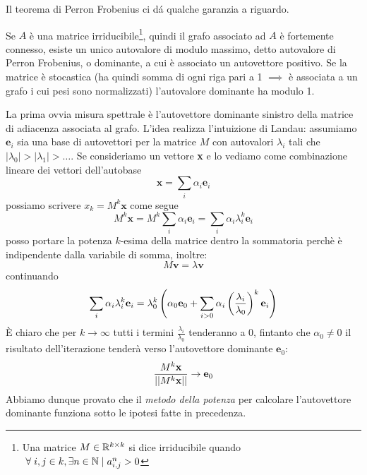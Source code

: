 Il teorema di Perron Frobenius ci dá qualche garanzia a riguardo.
\begin{teo}
    Se $A$ è una matrice irriducibile\footnote{Una matrice $M \in \mathbb{R}^{k \times k}$ si dice irriducibile quando $\hspace{1mm}\forall \hspace{1mm} i, j \in k, \exists n \in \mathbb{N} \hspace{1mm}|\hspace{1mm} a_{i, j}^n > 0$}, quindi il grafo associato ad $A$ è fortemente connesso, esiste un unico autovalore di modulo massimo, detto autovalore di Perron Frobenius, o dominante, a cui è associato un autovettore positivo. Se la matrice è stocastica (ha quindi somma di ogni riga pari a 1 $\implies$ è associata a un grafo i cui pesi sono normalizzati) l'autovalore dominante ha modulo 1.
\end{teo}
\noindent La prima ovvia misura spettrale è l'autovettore dominante sinistro della matrice di adiacenza associata al grafo. L'idea realizza l'intuizione di Landau: assumiamo $\textbf{e}_i$ sia una base di autovettori per la matrice $M$ con autovalori $\lambda_i$ tali che $|\lambda_0| > |\lambda_1| > \dots$. Se consideriamo un vettore \textbf{x} e lo vediamo come combinazione lineare dei vettori dell'autobase
\begin{equation*}
    \textbf{x} = \sum_i{\alpha_i\textbf{e}_i}
\end{equation*}
possiamo scrivere $x_k = M^k\textbf{x}$ come segue
\begin{equation*}
    M^k\textbf{x} = M^k\sum_i{\alpha_i\textbf{e}_i} = \sum_i{\alpha_i \lambda_i^k \textbf{e}_i}
\end{equation*}
posso portare la potenza $k$-esima della matrice dentro la sommatoria perchè è indipendente dalla variabile di somma, inoltre:
\begin{equation*}
    M\textbf{v} = \lambda \textbf{v}
\end{equation*}
continuando
\begin{equation*}
    \sum_i{\alpha_i \lambda_i^k \textbf{e}_i} = \lambda_0^k\left(\alpha_0\textbf{e}_0 + \sum_{i > 0}{\alpha_i\left(\frac{\lambda_i}{\lambda_0}\right)^k\textbf{e}_i}\right)
\end{equation*}
È chiaro che per $k \to \infty$ tutti i termini $\frac{\lambda_i}{\lambda_0}$ tenderanno a 0, fintanto che $\alpha_0 \neq 0$ il risultato dell'iterazione tenderà verso l'autovettore dominante $\textbf{e}_0$:
\begin{equation*}
    \frac{M^k\textbf{x}}{\lvert\lvert M^k\textbf{x} \rvert\rvert} \to \textbf{e}_0
\end{equation*}
Abbiamo dunque provato che il \textit{metodo della potenza} per calcolare l'autovettore dominante funziona sotto le ipotesi fatte in precedenza.


